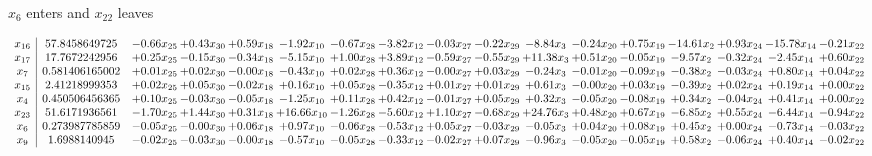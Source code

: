 \documentclass[9pt]{article}
\begin{document}
 $ x_{6} $ enters and $ x_{22} $ leaves 

 \[\begin{array}{c| c c@{\hskip 2pt} c@{\hskip 2pt} c@{\hskip 2pt} c@{\hskip 2pt} c@{\hskip 2pt} c@{\hskip 2pt} c@{\hskip 2pt} c@{\hskip 2pt} c@{\hskip 2pt} c@{\hskip 2pt} c@{\hskip 2pt} c@{\hskip 2pt} c@{\hskip 2pt} c@{\hskip 2pt} c@{\hskip 2pt} }
 x_{16}   &  57.8458649725 & -0.66 x_{25} & +  0.43 x_{30} & +  0.59 x_{18} & -1.92 x_{10} & -0.67 x_{28} & -3.82 x_{12} & -0.03 x_{27} & -0.22 x_{29} & -8.84 x_{3} & -0.24 x_{20} & +  0.75 x_{19} & -14.61 x_{2} & +  0.93 x_{24} & -15.78 x_{14} & -0.21 x_{22}\\
 x_{17}   &  17.7672242956 & +  0.25 x_{25} & -0.15 x_{30} & -0.34 x_{18} & -5.15 x_{10} & +  1.00 x_{28} & +  3.89 x_{12} & -0.59 x_{27} & -0.55 x_{29} & + 11.38 x_{3} & +  0.51 x_{20} & -0.05 x_{19} & -9.57 x_{2} & -0.32 x_{24} & -2.45 x_{14} & +  0.60 x_{22}\\
 x_{7}   &  0.581406165002 & +  0.01 x_{25} & +  0.02 x_{30} & -0.00 x_{18} & -0.43 x_{10} & +  0.02 x_{28} & +  0.36 x_{12} & -0.00 x_{27} & +  0.03 x_{29} & -0.24 x_{3} & -0.01 x_{20} & -0.09 x_{19} & -0.38 x_{2} & -0.03 x_{24} & +  0.80 x_{14} & +  0.04 x_{22}\\
 x_{15}   &  2.41218999353 & +  0.02 x_{25} & +  0.05 x_{30} & -0.02 x_{18} & +  0.16 x_{10} & +  0.05 x_{28} & -0.35 x_{12} & +  0.01 x_{27} & +  0.01 x_{29} & +  0.61 x_{3} & -0.00 x_{20} & +  0.03 x_{19} & -0.39 x_{2} & +  0.02 x_{24} & +  0.19 x_{14} & +  0.00 x_{22}\\
 x_{4}   &  0.450506456365 & +  0.10 x_{25} & -0.03 x_{30} & -0.05 x_{18} & -1.25 x_{10} & +  0.11 x_{28} & +  0.42 x_{12} & -0.01 x_{27} & +  0.05 x_{29} & +  0.32 x_{3} & -0.05 x_{20} & -0.08 x_{19} & +  0.34 x_{2} & -0.04 x_{24} & +  0.41 x_{14} & +  0.00 x_{22}\\
 x_{23}   &  51.6171936561 & -1.70 x_{25} & +  1.44 x_{30} & +  0.31 x_{18} & + 16.66 x_{10} & -1.26 x_{28} & -5.60 x_{12} & +  1.10 x_{27} & -0.68 x_{29} & + 24.76 x_{3} & +  0.48 x_{20} & +  0.67 x_{19} & -6.85 x_{2} & +  0.55 x_{24} & -6.44 x_{14} & -0.94 x_{22}\\
 x_{6}   &  0.273987785859 & -0.05 x_{25} & -0.00 x_{30} & +  0.06 x_{18} & +  0.97 x_{10} & -0.06 x_{28} & -0.53 x_{12} & +  0.05 x_{27} & -0.03 x_{29} & -0.05 x_{3} & +  0.04 x_{20} & +  0.08 x_{19} & +  0.45 x_{2} & +  0.00 x_{24} & -0.73 x_{14} & -0.03 x_{22}\\
 x_{9}   &  1.6988140945 & -0.02 x_{25} & -0.03 x_{30} & -0.00 x_{18} & -0.57 x_{10} & -0.05 x_{28} & -0.33 x_{12} & -0.02 x_{27} & +  0.07 x_{29} & -0.96 x_{3} & -0.05 x_{20} & -0.05 x_{19} & +  0.58 x_{2} & -0.06 x_{24} & +  0.40 x_{14} & -0.02 x_{22}\\

\end{array}\]
\end{document}

